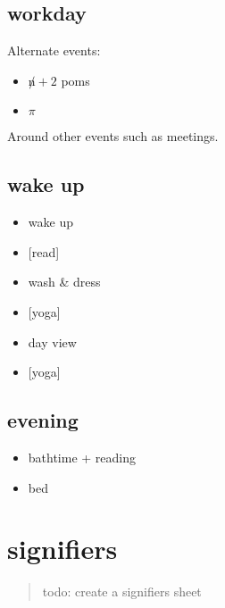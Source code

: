 \documentclass[]{book}
\providecommand{\tightlist}{%
  \setlength{\itemsep}{0pt}\setlength{\parskip}{0pt}}
\begin{document}
\hypertarget{workday}{%
\subsection{workday}\label{workday}}

Alternate events:

\begin{itemize}
\tightlist
\item
  \(\not n + 2\) poms
\item
  \(\pi\)
\end{itemize}

Around other events such as meetings.

\hypertarget{wake-up}{%
\subsection{wake up}\label{wake-up}}

\begin{itemize}
\tightlist
\item
  wake up
\item
  {[}read{]}
\item
  wash \& dress
\item
  {[}yoga{]}
\item
  \protect\hypertarget{day-view}{}{day view}
\item
  {[}yoga{]}
\end{itemize}

\hypertarget{evening}{%
\subsection{evening}\label{evening}}

\begin{itemize}
\tightlist
\item
  bathtime + reading
\item
  bed
\end{itemize}

\hypertarget{signifiers}{%
\section{signifiers}\label{signifiers}}

\begin{quote}
todo: create a signifiers sheet
\end{quote}
\end{document}

